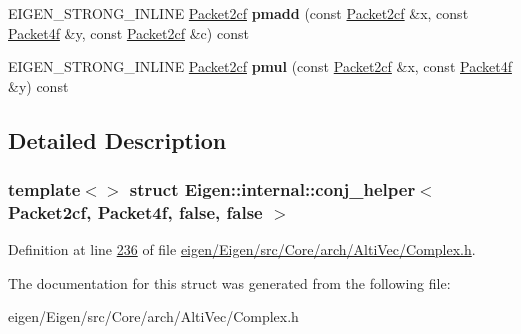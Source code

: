 \begin{DoxyCompactItemize}
E\+I\+G\+E\+N\+\_\+\+S\+T\+R\+O\+N\+G\+\_\+\+I\+N\+L\+I\+NE \hyperlink{struct_eigen_1_1internal_1_1_packet2cf}{Packet2cf} {\bfseries pmadd} (const \hyperlink{struct_eigen_1_1internal_1_1_packet2cf}{Packet2cf} \&x, const \hyperlink{struct_eigen_1_1internal_1_1_packet4f}{Packet4f} \&y, const \hyperlink{struct_eigen_1_1internal_1_1_packet2cf}{Packet2cf} \&c) const
\item 
\mbox{\label{struct_eigen_1_1internal_1_1conj__helper_3_01_packet2cf_00_01_packet4f_00_01false_00_01false_01_4_ad5efd350158730484a9c4092b569359b}} 
E\+I\+G\+E\+N\+\_\+\+S\+T\+R\+O\+N\+G\+\_\+\+I\+N\+L\+I\+NE \hyperlink{struct_eigen_1_1internal_1_1_packet2cf}{Packet2cf} {\bfseries pmul} (const \hyperlink{struct_eigen_1_1internal_1_1_packet2cf}{Packet2cf} \&x, const \hyperlink{struct_eigen_1_1internal_1_1_packet4f}{Packet4f} \&y) const
\end{DoxyCompactItemize}


\subsection{Detailed Description}
\subsubsection*{template$<$$>$\newline
struct Eigen\+::internal\+::conj\+\_\+helper$<$ Packet2cf, Packet4f, false, false $>$}



Definition at line \hyperlink{eigen_2_eigen_2src_2_core_2arch_2_alti_vec_2_complex_8h_source_l00236}{236} of file \hyperlink{eigen_2_eigen_2src_2_core_2arch_2_alti_vec_2_complex_8h_source}{eigen/\+Eigen/src/\+Core/arch/\+Alti\+Vec/\+Complex.\+h}.



The documentation for this struct was generated from the following file\+:\begin{DoxyCompactItemize}
\item 
eigen/\+Eigen/src/\+Core/arch/\+Alti\+Vec/\+Complex.\+h\end{DoxyCompactItemize}
